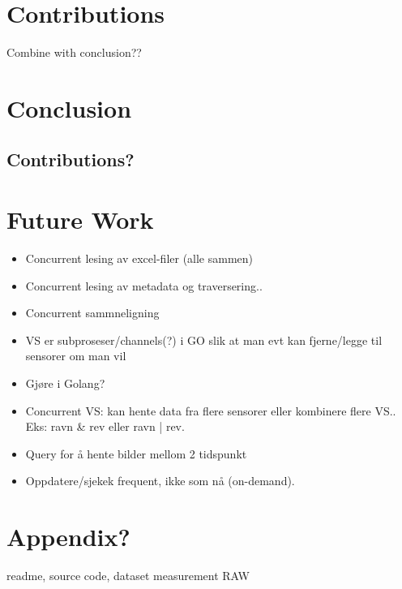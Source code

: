 \documentclass[USenglish]{uit-thesis}
\begin{document}
\chapter{Contributions}
Combine with conclusion??
\chapter{Conclusion}
\section{Contributions?}

\chapter{Future Work}
\begin{itemize}
\item Concurrent lesing av excel-filer (alle sammen)
\item Concurrent lesing av metadata og traversering..
\item Concurrent sammneligning
\item VS er subproseser/channels(?) i GO slik at man evt kan fjerne/legge til sensorer om man vil
\item Gjøre i Golang?
\item Concurrent VS: kan hente data fra flere sensorer eller kombinere flere VS.. Eks: ravn \& rev eller ravn | rev.
\item Query for å hente bilder mellom 2 tidspunkt
\item Oppdatere/sjekek frequent, ikke som nå (on-demand).
\end{itemize}
\chapter{Appendix?}
readme, source code, dataset measurement RAW
\backmatter



\newpage{}
\end{document}

